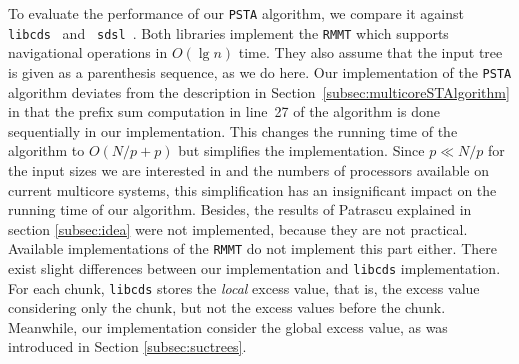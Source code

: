 To evaluate the performance of our {\tt PSTA} algorithm, we compare it against
{\tt libcds}~\cite{libcds} and {\tt
  sdsl}~\cite{sdsl}.
Both libraries implement the {\tt RMMT} which supports navigational operations in $O(\lg n)$ time.
They also assume that the input tree is given as a parenthesis sequence, as we
do here.
Our implementation of the {\tt PSTA} algorithm deviates from the description in
Section~\ref{subsec:multicoreSTAlgorithm} in that the prefix sum computation in
line~27 of the algorithm is done sequentially in our implementation.
This changes the running time of the algorithm to $O(N/p + p)$ but simplifies the
implementation.
Since $p \ll N/p$ for the input sizes we are interested in and the numbers of
processors available on current multicore systems, this simplification has an
insignificant impact on the running time of our algorithm. Besides, the results of
Patrascu explained in section \ref{subsec:idea} were not implemented, because they
are not practical. Available implementations of
the {\tt RMMT} do not implement this part either. There exist slight differences between
our implementation and {\tt libcds} implementation. For each chunk, {\tt libcds} stores
the \emph{local} excess value, that is, the excess value considering only the chunk, but not
the excess values before the chunk. Meanwhile, our implementation consider the global excess
value, as was introduced in Section \ref{subsec:suctrees}.
